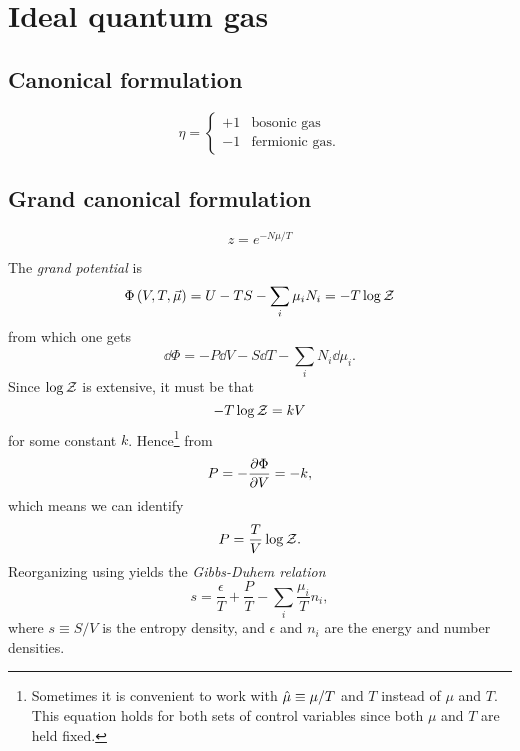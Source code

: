\section{Ideal quantum gas}

\subsection{Canonical formulation}

\begin{equation}
\eta=
  \begin{cases}
     +1 & \text{bosonic gas} \\
     -1 & \text{fermionic gas}.
  \end{cases}
\end{equation}

\subsection{Grand canonical formulation}

\begin{equation}\label{eq:fugacity}
  z=e^{-N\mu/T}
\end{equation}

The {\it grand potential} is
\begin{equation}\label{eq:grand}
  \Phi\left(V,T,\vec{\mu}\right)=U-TS-\sum_i\mu_i N_i=-T\log\mathcal{Z}
\end{equation}
from which one gets
\begin{equation}\label{eq:1stlawgrand}
  \dd\Phi=-P\dd V-S\dd T-\sum_i N_i\dd\mu_i.
\end{equation}
Since $\log\mathcal{Z}$ is extensive, it must be that
\begin{equation}
-T\log\mathcal{Z}=kV
\end{equation}
for some constant $k$. Hence\footnote{Sometimes it is convenient to work
with $\hat{\mu}\equiv\mu/T$ and $T$ instead of $\mu$ and $T$. This equation
holds for both sets of control variables since both $\mu$ and $T$ are
held fixed.} from 
\begin{equation}
P=-\pdv{\Phi}{V}=-k,
\end{equation}
which means we can identify
\begin{equation}\label{eq:pgrand}
P=\frac{T}{V}\log\mathcal{Z}.
\end{equation}
Reorganizing  using 
yields the {\it Gibbs-Duhem relation}
\begin{equation}
  s=\frac{\epsilon}{T}+\frac{P}{T}-\sum_i\frac{\mu_i}{T}n_i,
\end{equation}
where $s\equiv S/V$ is the entropy density, and $\epsilon$ and $n_i$
are the energy and number densities.


